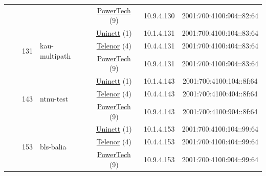 \begin{small}
\begin{center}
\begin{longtable}{|c|c|c|c|c|c|c|c|}
  &  &  &  & \multicolumn{2}{|c|}{\tiny{\href{http://www.powertech.no}{PowerTech} (9)}} & \tiny{10.9.4.130} & \tiny{2001:700:4100:904::82:64} \\* \cline{3-3}\cline{4-4}\cline{5-5}\cline{6-6}\cline{7-7}\cline{8-8}
  &  & \multirow{3}{*}{\tiny{131}} & \multicolumn{1}{|l|}{\multirow{3}{*}{\tiny{kau-multipath}}} & \multicolumn{2}{|c|}{\tiny{\href{https://www.uninett.no}{Uninett} (1)}} & \tiny{10.1.4.131} & \tiny{2001:700:4100:104::83:64} \\* \cline{5-5}\cline{6-6}\cline{7-7}\cline{8-8}
  &  &  &  & \multicolumn{2}{|c|}{\tiny{\href{https://www.telenor.no}{Telenor} (4)}} & \tiny{10.4.4.131} & \tiny{2001:700:4100:404::83:64} \\* \cline{5-5}\cline{6-6}\cline{7-7}\cline{8-8}
  &  &  &  & \multicolumn{2}{|c|}{\tiny{\href{http://www.powertech.no}{PowerTech} (9)}} & \tiny{10.9.4.131} & \tiny{2001:700:4100:904::83:64} \\* \cline{3-3}\cline{4-4}\cline{5-5}\cline{6-6}\cline{7-7}\cline{8-8}
  &  & \multirow{3}{*}{\tiny{143}} & \multicolumn{1}{|l|}{\multirow{3}{*}{\tiny{ntnu-test}}} & \multicolumn{2}{|c|}{\tiny{\href{https://www.uninett.no}{Uninett} (1)}} & \tiny{10.1.4.143} & \tiny{2001:700:4100:104::8f:64} \\* \cline{5-5}\cline{6-6}\cline{7-7}\cline{8-8}
  &  &  &  & \multicolumn{2}{|c|}{\tiny{\href{https://www.telenor.no}{Telenor} (4)}} & \tiny{10.4.4.143} & \tiny{2001:700:4100:404::8f:64} \\* \cline{5-5}\cline{6-6}\cline{7-7}\cline{8-8}
  &  &  &  & \multicolumn{2}{|c|}{\tiny{\href{http://www.powertech.no}{PowerTech} (9)}} & \tiny{10.9.4.143} & \tiny{2001:700:4100:904::8f:64} \\* \cline{3-3}\cline{4-4}\cline{5-5}\cline{6-6}\cline{7-7}\cline{8-8}
  &  & \multirow{3}{*}{\tiny{153}} & \multicolumn{1}{|l|}{\multirow{3}{*}{\tiny{bls-balia}}} & \multicolumn{2}{|c|}{\tiny{\href{https://www.uninett.no}{Uninett} (1)}} & \tiny{10.1.4.153} & \tiny{2001:700:4100:104::99:64} \\* \cline{5-5}\cline{6-6}\cline{7-7}\cline{8-8}
  &  &  &  & \multicolumn{2}{|c|}{\tiny{\href{https://www.telenor.no}{Telenor} (4)}} & \tiny{10.4.4.153} & \tiny{2001:700:4100:404::99:64} \\* \cline{5-5}\cline{6-6}\cline{7-7}\cline{8-8}
  &  &  &  & \multicolumn{2}{|c|}{\tiny{\href{http://www.powertech.no}{PowerTech} (9)}} & \tiny{10.9.4.153} & \tiny{2001:700:4100:904::99:64} \\* \cline{3-3}\cline{4-4}\cline{5-5}\cline{6-6}\cline{7-7}\cline{8-8}

\end{longtable}
\end{center}
\end{small}
